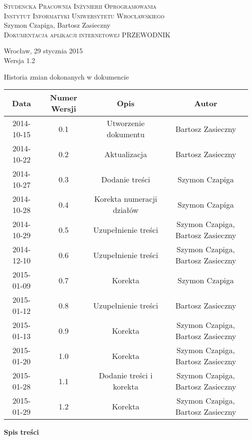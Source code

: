 \documentclass[12pt,a4paper]{report}
\makeatletter
\newcommand*{\toccontents}{\@starttoc{toc}}
\makeatother
\begin{document}
\newcommand{\itab}[1]{\hspace{4em}\rlap{#1}}
\newcommand{\tab}[1]{\hspace{.2\textwidth}\rlap{#1}}

\begin{titlepage}
\begin{center}
\textsc{Studencka Pracownia Inżynierii Oprogramowania}\\[0.5cm]
\textsc{Instytut Informatyki Uniwersytetu Wrocławskiego}\\[8.0cm]

Szymon Czapiga, Bartosz Zasieczny\\[1.0cm]

\LARGE{\textsc{Dokumentacja aplikacji internetowej PRZEWODNIK}}\\[8.5cm]

\begin{normalsize}

Wrocław, 29 stycznia 2015\\[0.5cm]
Wersja 1.2
\end{normalsize}
\end{center}
\end{titlepage}
\setcounter{page}{3}
\begin{table}[h1]
 \itab \textit{Tabela 0.} Historia zmian dokonanych w dokumencie
  \begin{center}
    \begin{tabular}{| c | c | c | c |}
    \hline
    Data & Numer Wersji & Opis & Autor \\
    \hline \hline
    2014-10-15 & 0.1 & Utworzenie dokumentu & Bartosz Zasieczny \\
    \hline
    2014-10-22 & 0.2 & Aktualizacja & Bartosz Zasieczny \\
    \hline
    2014-10-27 & 0.3 & Dodanie treści  & Szymon Czapiga \\
    \hline
    2014-10-28 & 0.4 & Korekta numeracji działów & Szymon Czapiga \\
    \hline
    2014-10-29 & 0.5 & Uzupełnienie treści & Szymon Czapiga, Bartosz Zasieczny \\
    \hline
    2014-12-10 & 0.6 & Uzupełnienie treści & Szymon Czapiga, Bartosz Zasieczny \\
    \hline
    2015-01-09 & 0.7 & Korekta & Szymon Czapiga\\
    \hline
    2015-01-12 & 0.8 & Uzupełnienie treści & Bartosz Zasieczny \\
    \hline
    2015-01-13 & 0.9 & Korekta & Szymon Czapiga, Bartosz Zasieczny \\
    \hline
    2015-01-20 & 1.0 & Korekta & Szymon Czapiga, Bartosz Zasieczny \\
    \hline
    2015-01-28 & 1.1 & Dodanie treści i korekta & Szymon Czapiga, Bartosz Zasieczny \\
    \hline
    2015-01-29 & 1.2 & Korekta & Szymon Czapiga, Bartosz Zasieczny \\
    \hline
    \end{tabular}
  \end{center}
\end{table}
\textbf{\large{Spis treści}}\\[0.3cm]
\toccontents
\newpage
\end{document}
